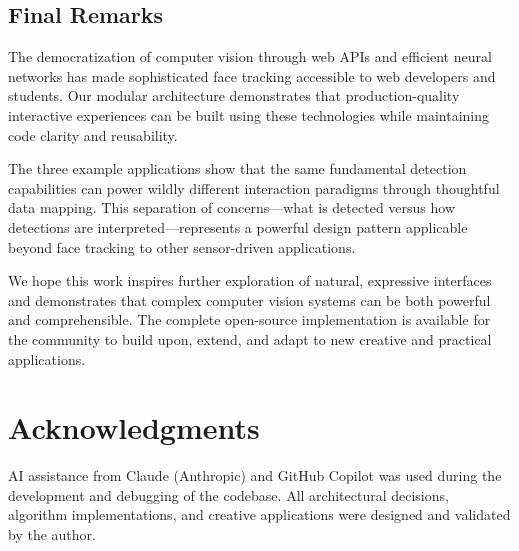 \documentclass[sigconf]{acmart}
\begin{document}
\subsection{Final Remarks}

The democratization of computer vision through web APIs and efficient neural networks has made sophisticated face tracking accessible to web developers and students. Our modular architecture demonstrates that production-quality interactive experiences can be built using these technologies while maintaining code clarity and reusability.

The three example applications show that the same fundamental detection capabilities can power wildly different interaction paradigms through thoughtful data mapping. This separation of concerns---what is detected versus how detections are interpreted---represents a powerful design pattern applicable beyond face tracking to other sensor-driven applications.

We hope this work inspires further exploration of natural, expressive interfaces and demonstrates that complex computer vision systems can be both powerful and comprehensible. The complete open-source implementation is available for the community to build upon, extend, and adapt to new creative and practical applications.

\section*{Acknowledgments}

AI assistance from Claude (Anthropic) and GitHub Copilot was used during the development and debugging of the codebase. All architectural decisions, algorithm implementations, and creative applications were designed and validated by the author.
\end{document}
